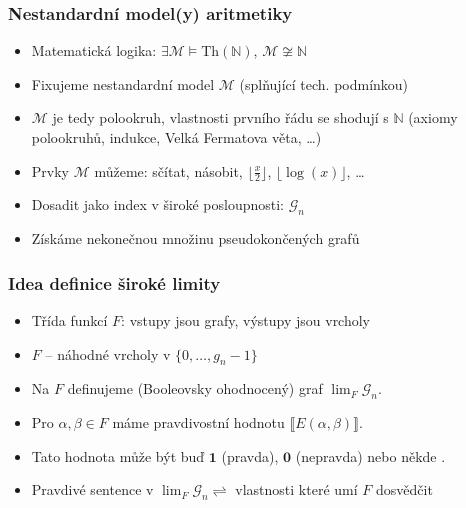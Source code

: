 \documentclass{beamer}
\newcommand{\N}{\mathbb{N}}
\newcommand{\M}{\mathcal{M}}
\newcommand{\bbl}{\llbracket}
\newcommand{\bbr}{\rrbracket}
\newcommand{\G}{\mathcal{G}}
\newcommand{\0}{\textbf{0}}
\newcommand{\1}{\textbf{1}}
\newcommand{\Th}{\text{Th}}
\begin{document}
\begin{frame}
\frametitle{Nestandardní model(y) aritmetiky}
\begin{itemize}[<+->]
\item Matematická logika: $\exists \M \models \Th(\N)$, $\M\not\cong\N$
\item Fixujeme nestandardní model $\M$ (splňující tech. podmínkou)
\item $\M$ je tedy polookruh, vlastnosti prvního řádu se shodují s $\N$ (axiomy polookruhů, indukce, Velká Fermatova věta, \ldots)
\item Prvky $\M$ můžeme: sčítat, násobit, $\lfloor \frac{x}{2}\rfloor$, $\lfloor\log(x)\rfloor$, \ldots
\item Dosadit jako index v široké posloupnosti: $\G_n$
\item Získáme nekonečnou množinu pseudokončených grafů
\end{itemize}
\end{frame}

\begin{frame}
\frametitle{Idea definice široké limity}
\begin{itemize}[<+->]
\item Třída funkcí $F$: vstupy jsou grafy, výstupy jsou vrcholy
\item $F$ -- náhodné vrcholy v $\{0,\dots,g_n-1\}$ 
\item Na $F$ definujeme (Booleovsky ohodnocený) graf $\lim_F \G_n$.
\item Pro $\alpha,\beta\in F$ máme pravdivostní hodnotu $\bbl E(\alpha,\beta) \bbr$.
\item Tato hodnota může být buď $\1$ (pravda), $\0$ (nepravda) nebo někde .
\item Pravdivé sentence v $\lim_F\G_n \rightleftharpoons$ vlastnosti které umí $F$ dosvědčit
\end{itemize}
\end{frame}
\end{document}
